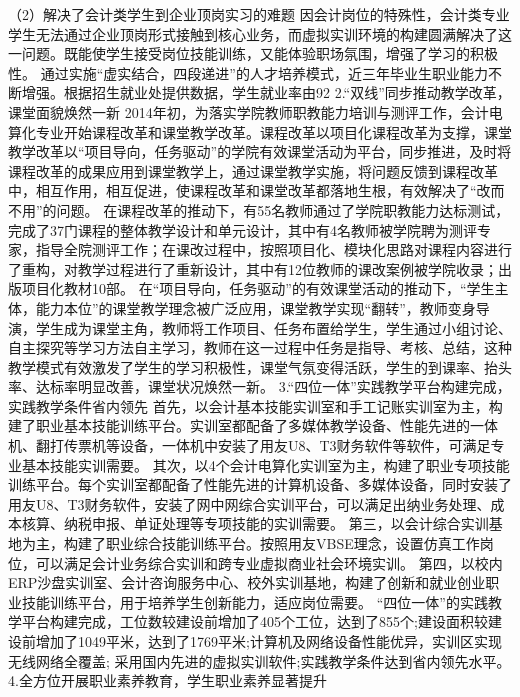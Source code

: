 （2）解决了会计类学生到企业顶岗实习的难题
因会计岗位的特殊性，会计类专业学生无法通过企业顶岗形式接触到核心业务，而虚拟实训环境的构建圆满解决了这一问题。既能使学生接受岗位技能训练，又能体验职场氛围，增强了学习的积极性。
通过实施“虚实结合，四段递进”的人才培养模式，近三年毕业生职业能力不断增强。根据招生就业处提供数据，学生就业率由92%
2.“双线”同步推动教学改革，课堂面貌焕然一新
2014年初，为落实学院教师职教能力培训与测评工作，会计电算化专业开始课程改革和课堂教学改革。课程改革以项目化课程改革为支撑，课堂教学改革以“项目导向，任务驱动”的学院有效课堂活动为平台，同步推进，及时将课程改革的成果应用到课堂教学上，通过课堂教学实施，将问题反馈到课程改革中，相互作用，相互促进，使课程改革和课堂改革都落地生根，有效解决了“改而不用”的问题。
在课程改革的推动下，有55名教师通过了学院职教能力达标测试，完成了37门课程的整体教学设计和单元设计，其中有4名教师被学院聘为测评专家，指导全院测评工作；在课改过程中，按照项目化、模块化思路对课程内容进行了重构，对教学过程进行了重新设计，其中有12位教师的课改案例被学院收录；出版项目化教材10部。
在“项目导向，任务驱动”的有效课堂活动的推动下，“学生主体，能力本位”的课堂教学理念被广泛应用，课堂教学实现“翻转”，教师变身导演，学生成为课堂主角，教师将工作项目、任务布置给学生，学生通过小组讨论、自主探究等学习方法自主学习，教师在这一过程中任务是指导、考核、总结，这种教学模式有效激发了学生的学习积极性，课堂气氛变得活跃，学生的到课率、抬头率、达标率明显改善，课堂状况焕然一新。
3.“四位一体”实践教学平台构建完成，实践教学条件省内领先
首先，以会计基本技能实训室和手工记账实训室为主，构建了职业基本技能训练平台。实训室都配备了多媒体教学设备、性能先进的一体机、翻打传票机等设备，一体机中安装了用友U8、T3财务软件等软件，可满足专业基本技能实训需要。
其次，以4个会计电算化实训室为主，构建了职业专项技能训练平台。每个实训室都配备了性能先进的计算机设备、多媒体设备，同时安装了用友U8、T3财务软件，安装了网中网综合实训平台，可以满足出纳业务处理、成本核算、纳税申报、单证处理等专项技能的实训需要。
第三，以会计综合实训基地为主，构建了职业综合技能训练平台。按照用友VBSE理念，设置仿真工作岗位，可以满足会计业务综合实训和跨专业虚拟商业社会环境实训。
第四，以校内ERP沙盘实训室、会计咨询服务中心、校外实训基地，构建了创新和就业创业职业技能训练平台，用于培养学生创新能力，适应岗位需要。
“四位一体”的实践教学平台构建完成，工位数较建设前增加了405个工位，达到了855个;建设面积较建设前增加了1049平米，达到了1769平米;计算机及网络设备性能优异，实训区实现无线网络全覆盖; 采用国内先进的虚拟实训软件;实践教学条件达到省内领先水平。
4.全方位开展职业素养教育，学生职业素养显著提升
